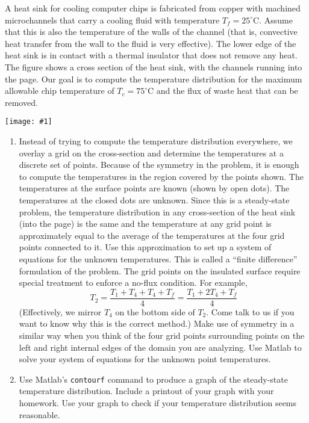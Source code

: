 \documentclass[12pt,letterpaper]{hmcpset}
\newcommand{\diagram}[2]{\begin{center}\texttt{[image: \#1]}\end{center}}
\begin{document}
	\begin{problem}[2]
		A heat sink for cooling computer chips is fabricated from copper with machined microchannels
		that carry a cooling fluid with temperature $T_f = 25^{\circ}$C. Assume that this is also the
		temperature of the walls of the channel (that is, convective heat transfer from the wall to the
		fluid is very effective). The lower edge of the heat sink is in contact with a thermal insulator
		that does not remove any heat. The figure shows a cross section of the heat sink, with the
		channels running into the page. Our goal is to compute the temperature distribution for the
		maximum allowable chip temperature of $T_c = 75^{\circ}$C and the flux of waste heat that can be
		removed.
		\diagram{Heat_sink}{4}
		\begin{enumerate}
			\item Instead of trying to compute the temperature distribution everywhere, we overlay a
			grid on the cross-section and determine the temperatures at a discrete set of points.
			Because of the symmetry in the problem, it is enough to compute the temperatures in the
			region covered by the points shown. The temperatures at the surface points are known
			(shown by open dots). The temperatures at the closed dots are unknown. Since this is a
			steady-state problem, the temperature distribution in any cross-section of the heat sink
			(into the page) is the same and the temperature at any grid point is approximately equal
			to the average of the temperatures at the four grid points connected to it. Use this
			approximation to set up a system of equations for the unknown temperatures. This is
			called a ``finite difference'' formulation of the problem. The grid points on the insulated
			surface require special treatment to enforce a no-flux condition. For example,
			$$ T_2 = \frac{T_1+T_4+T_4+T_f}{4} = \frac{T_1+2T_4+T_f}{4} $$
			(Effectively, we mirror $T_4$ on the bottom side of $T_2$. Come talk to us if you want to know
			why this is the correct method.) Make use of symmetry in a similar way when you
			think of the four grid points surrounding points on the left and right internal edges of
			the domain you are analyzing. Use Matlab to solve your system of equations for the
			unknown point temperatures.
			
			\item Use Matlab's \texttt{contourf} command to produce a graph of the steady-state temperature
			distribution. Include a printout of your graph with your homework. Use your graph to
			check if your temperature distribution seems reasonable.
		\end{enumerate}
	\end{problem}
	
\end{document}
